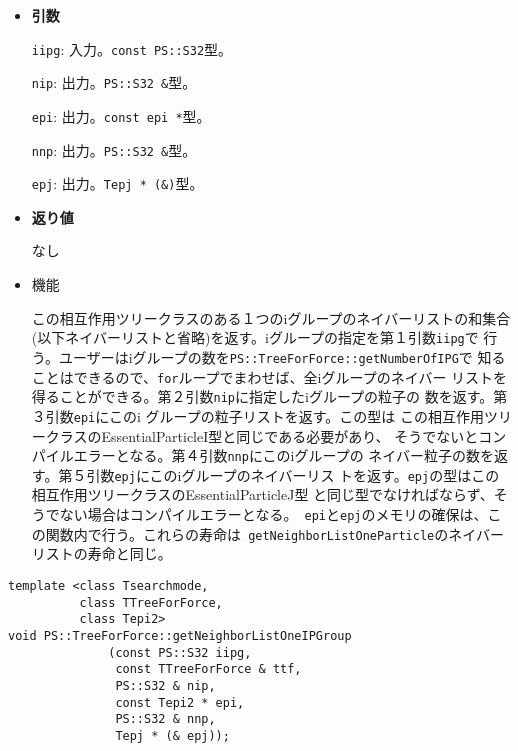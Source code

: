 \begin{itemize}

\item{{\bf 引数}}

{\tt iipg}: 入力。{\tt const PS::S32}型。

{\tt nip}: 出力。{\tt PS::S32 \&}型。

{\tt epi}: 出力。{\tt const epi *}型。

{\tt nnp}: 出力。{\tt PS::S32 \&}型。

{\tt epj}: 出力。{\tt Tepj * (\&)}型。

\item{{\bf 返り値}}

なし

\item 機能

この相互作用ツリークラスのある１つのiグループのネイバーリストの和集合
(以下ネイバーリストと省略)を返す。iグループの指定を第１引数{\tt iipg}で
行う。ユーザーはiグループの数を{\tt PS::TreeForForce::getNumberOfIPG}で
知ることはできるので、{\tt for}ループでまわせば、全iグループのネイバー
リストを得ることができる。第２引数{\tt nip}に指定したiグループの粒子の
数を返す。第３引数{\tt epi}にこのi グループの粒子リストを返す。この型は
この相互作用ツリークラスのEssentialParticleI型と同じである必要があり、
そうでないとコンパイルエラーとなる。第４引数{\tt nnp}にこのiグループの
ネイバー粒子の数を返す。第５引数{\tt epj}にこのiグループのネイバーリス
トを返す。{\tt epj}の型はこの相互作用ツリークラスのEssentialParticleJ型
と同じ型でなければならず、そうでない場合はコンパイルエラーとなる。{\tt
epi}と{\tt epj}のメモリの確保は、この関数内で行う。これらの寿命は{\tt
getNeighborListOneParticle}のネイバーリストの寿命と同じ。

\end{itemize}

\begin{screen}
\begin{verbatim}
template <class Tsearchmode,
          class TTreeForForce,
          class Tepi2>
void PS::TreeForForce::getNeighborListOneIPGroup
              (const PS::S32 iipg,
               const TTreeForForce & ttf,
               PS::S32 & nip,
               const Tepi2 * epi,
               PS::S32 & nnp,
               Tepj * (& epj));
\end{verbatim}
\end{screen}

